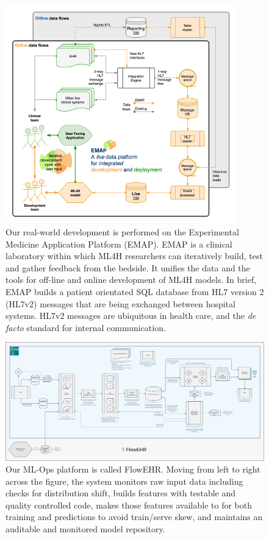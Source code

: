 \documentclass[utf8]{FrontiersinVancouver}
\begin{document}
\begin{figure}[h!]
\begin{center}
\includegraphics[width=10cm]{figs/emap.png}%
\end{center}
\caption{ 
Our real-world development is performed on the  Experimental Medicine Application Platform (EMAP). EMAP is a clinical laboratory within which ML4H researchers can iteratively build, test and gather feedback from the bedside. It unifies the data and the tools for off-line and online development of ML4H models. In brief, EMAP builds a patient orientated SQL database from HL7 version 2 (HL7v2) messages that are being exchanged between hospital systems. HL7v2 messages are ubiquitous in health care, and the \textit{de facto} standard for internal communication.
}\label{fig:1}
\end{figure}


\begin{figure}[h!]
\begin{center}
\includegraphics[width=15cm]{figs/flowehr.png}
\end{center}
\caption{
Our ML-Ops platform is called FlowEHR. Moving from left to right across the figure, the system monitors raw input data including checks for distribution shift, builds features with testable and quality controlled code, makes those features available to for both training and predictions to avoid train/serve skew, and maintains an auditable and monitored model repository.
}\label{fig:2}
\end{figure}
\end{document}
